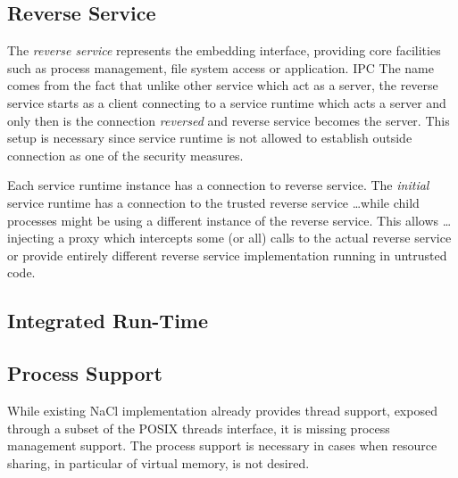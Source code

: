 \subsection{Reverse Service}


The \emph{reverse service} represents the embedding interface, providing
core facilities such as process management, file system access or
application. IPC %
The name comes from the fact that unlike other service which act as a
server, the reverse service starts as a client connecting to a service
runtime which acts a server and only then is the connection
\emph{reversed} and reverse service becomes the server. This setup is
necessary since service runtime is not allowed to establish outside
connection as one of the security measures.

Each service runtime instance has a connection to reverse service. The
\emph{initial} service runtime has a connection to the trusted reverse
service \ldots while child processes might be using a different instance
of the reverse service. This allows \ldots injecting a proxy which
intercepts some (or all) calls to the actual reverse service or provide
entirely different reverse service implementation running in untrusted
code.

\subsection{Integrated Run-Time}


\subsection{Process Support}
\label{sub:process_support}

While existing NaCl implementation already provides thread support,
exposed through a subset of the POSIX threads interface, it is missing
process management support. The process support is necessary in cases
when resource sharing, in particular of virtual memory, is not desired.

